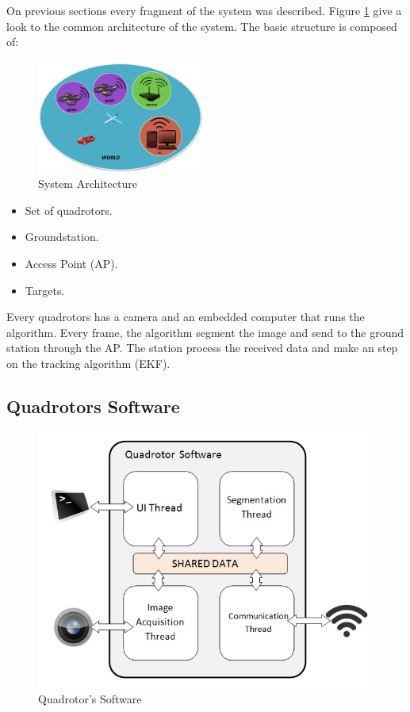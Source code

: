 On previous sections every fragment of the system was described. Figure \ref{fig:System_Architecture} give a look to the common architecture of the system. The basic structure is composed of:
\begin{figure}[hp]
	\centering
	\includegraphics[width=0.50\textwidth,natwidth=220,natheight=1467]{../Images/c2/Architecture.png}
	\caption{System Architecture}
	\label{fig:System_Architecture}
\end{figure}


\begin{itemize}
  \item Set of quadrotors.
  \item Groundstation.
  \item Access Point (AP).
  \item Targets.
\end{itemize}

Every quadrotors has a camera and an embedded computer that runs the algorithm. Every frame, the algorithm segment the image and send to the ground station through the AP. The station process the received data and make an step on the tracking algorithm (EKF).

\newpage
\subsection{Quadrotors Software}

	\begin{figure}[hp]
		\begin{center}
			\includegraphics[width=0.7\linewidth]{../Images/c2/Quadsoftware}
		\end{center}
		\caption{Quadrotor's Software}
		\label{fig:Quadsoftware}
	\end{figure}

